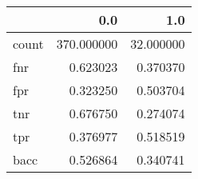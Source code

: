 \begin{tabular}{lrr}
\toprule
{} &         0.0 &        1.0 \\
\midrule
count &  370.000000 &  32.000000 \\
fnr   &    0.623023 &   0.370370 \\
fpr   &    0.323250 &   0.503704 \\
tnr   &    0.676750 &   0.274074 \\
tpr   &    0.376977 &   0.518519 \\
bacc  &    0.526864 &   0.340741 \\
\bottomrule
\end{tabular}
